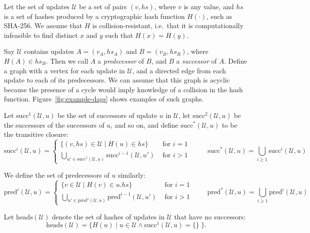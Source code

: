 \documentclass[a4paper,anonymous,USenglish]{lipics-v2019}
\begin{document}
Let the set of updates $\mathcal{U}$ be a set of pairs $(v, \mathit{hs})$, where $v$ is any value, and $\mathit{hs}$ is a set of hashes produced by a cryptographic hash function $H(\cdot)$, such as SHA-256.
We assume that $H$ is collision-resistant, i.e.\ that it is computationally infeasible to find distinct $x$ and $y$ such that $H(x) = H(y)$.

Say $\mathcal{U}$ contains updates $A = (v_A, \mathit{hs}_A)$ and $B = (v_B, \mathit{hs}_B)$, where $H(A) \in \mathit{hs}_B$.
Then we call $A$ a \emph{predecessor} of $B$, and $B$ a \emph{successor} of $A$.
Define a graph with a vertex for each update in $\mathcal{U}$, and a directed edge from each update to each of its predecessors.
We can assume that this graph is acyclic because the presence of a cycle would imply knowledge of a collision in the hash function.
Figure~\ref{fig:example-dags} shows examples of such graphs.

Let $\mathrm{succ}^1(\mathcal{U}, u)$ be the set of successors of update $u$ in $\mathcal{U}$, let $\mathrm{succ}^2(\mathcal{U}, u)$ be the successors of the successors of $u$, and so on, and define $\mathrm{succ}^*(\mathcal{U}, u)$ to be the transitive closure:
\[
\mathrm{succ}^i(\mathcal{U}, u) =
\begin{cases}
\{( v, \mathit{hs}) \in \mathcal{U} \mid H(u) \in \mathit{hs}\} & \text{ for } i=1 \\
\bigcup_{u' \in \mathrm{succ}^1(\mathcal{U}, u)} \mathrm{succ}^{i-1}(\mathcal{U}, u') & \text{ for } i>1
\end{cases}
\hspace{30pt}
\mathrm{succ}^*(\mathcal{U}, u) = \bigcup_{i \ge 1} \mathrm{succ}^i(\mathcal{U}, u)
\]

We define the set of predecessors of $u$ similarly:
\[
\mathrm{pred}^i(\mathcal{U}, u) =
\begin{cases}
\{ v \in \mathcal{U} \mid H(v) \in u.\mathit{hs}\} & \text{ for } i=1 \\
\bigcup_{u' \in \mathrm{pred}^1(\mathcal{U}, u)} \mathrm{pred}^{i-1}(\mathcal{U}, u') & \text{ for } i>1
\end{cases}
\hspace{26pt}
\mathrm{pred}^*(\mathcal{U}, u) = \bigcup_{i \ge 1} \mathrm{pred}^i(\mathcal{U}, u)
\]

Let $\mathrm{heads}(\mathcal{U})$ denote the set of hashes of updates in $\mathcal{U}$ that have no successors:
\[ \mathrm{heads}(\mathcal{U}) = \{H(u) \mid u \in \mathcal{U} \wedge \mathrm{succ}^1(\mathcal{U}, u) = \{\}\;\}. \]
\end{document}
